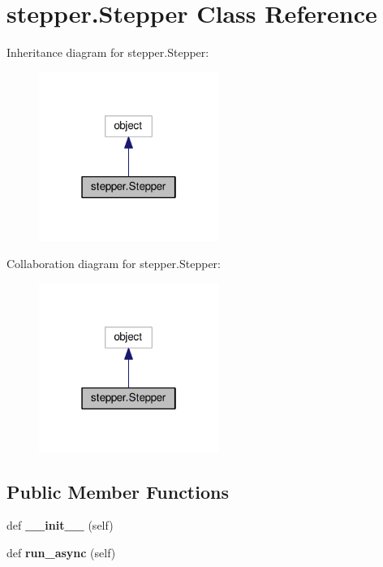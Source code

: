 \hypertarget{classstepper_1_1Stepper}{}\section{stepper.\+Stepper Class Reference}
\label{classstepper_1_1Stepper}


Inheritance diagram for stepper.\+Stepper\+:
\nopagebreak
\begin{figure}[H]
\begin{center}
\leavevmode
\includegraphics[width=166pt]{classstepper_1_1Stepper__inherit__graph}
\end{center}
\end{figure}


Collaboration diagram for stepper.\+Stepper\+:
\nopagebreak
\begin{figure}[H]
\begin{center}
\leavevmode
\includegraphics[width=166pt]{classstepper_1_1Stepper__coll__graph}
\end{center}
\end{figure}
\subsection*{Public Member Functions}
\begin{DoxyCompactItemize}
\item 
def {\bfseries \+\_\+\+\_\+init\+\_\+\+\_\+} (self)\hypertarget{classstepper_1_1Stepper_aaad0869347ab473e035679f01f296790}{}\label{classstepper_1_1Stepper_aaad0869347ab473e035679f01f296790}

\item 
def {\bfseries run\+\_\+async} (self)\hypertarget{classstepper_1_1Stepper_aa5a2d8c11f92fdf6a81182cbed4a758c}{}\label{classstepper_1_1Stepper_aa5a2d8c11f92fdf6a81182cbed4a758c}

\end{DoxyCompactItemize}
